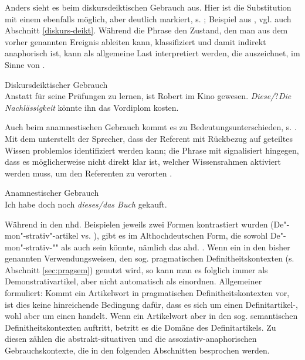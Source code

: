 Anders sieht es beim diskursdeiktischen  Gebrauch aus. Hier ist die Substitution mit einem  ebenfalls möglich, aber deutlich markiert, s. ; Beispiel aus \textcite[95]{Marx2011}, vgl. auch Abschnitt \ref{diskurs-deikt}. Während die Phrase   den Zustand, den man aus dem vorher genannten Ereignis ableiten kann, klassifiziert und damit indirekt anaphorisch   ist, kann  als allgemeine Last interpretiert werden, die  auszeichnet, im Sinne von .

\begin{exe}
	\ex \label{ex:diskurs-deikt-def} Diskursdeiktischer Gebrauch\\ Anstatt für seine Prüfungen zu lernen, ist Robert im Kino gewesen. \textit{Diese\slash}?\textit{Die Nachlässigkeit} könnte ihn das Vordiplom kosten.
	 \end{exe}

Auch beim anamnestischen  Gebrauch kommt es zu Bedeutungsunterschieden, s. . Mit dem  unterstellt der Sprecher,  dass der Referent mit Rückbezug auf geteiltes Wissen problemlos identifiziert werden kann; die Phrase  mit  signalisiert hingegen, dass es möglicherweise nicht direkt klar ist, welcher Wissensrahmen aktiviert werden muss, um den Referenten zu verorten \parencite[79--80]{Bisle-Muller1991}. 
 
\begin{exe}
	\ex \label{ex:anamndef}Anamnestischer Gebrauch\\Ich habe doch noch \textit{dieses/das Buch} gekauft.
\end{exe}
 
Während in den nhd. Beispielen jeweils zwei Formen kontrastiert wurden (De"-mon"-strativ"-artikel   vs.  ), gibt es im Althochdeutschen  Form, die sowohl De"-mon"-strativ-""  als auch  sein könnte, nämlich das ahd. . 
Wenn ein   in den bisher genannten Verwendungsweisen, den sog. pragmatischen  Definitheitskontexten (s. Abschnitt \ref{sec:pragsem}) genutzt wird, so kann man es folglich immer als Demonstrativartikel, aber nicht automatisch als  einordnen. Allgemeiner formuliert: Kommt ein Artikelwort in pragmatischen Definitheitskontexten  vor, ist dies keine  hinreichende Bedingung dafür, dass es sich um einen Definitartikel-, wohl aber um einen  handelt. Wenn ein Artikelwort aber in den sog. semantischen Definitheitskontexten  auftritt, betritt es die Domäne des Definitartikels. Zu diesen zählen die abstrakt-situativen  und die assoziativ-anaphorischen  Gebrauchskontexte, die in den folgenden Abschnitten besprochen werden. 



